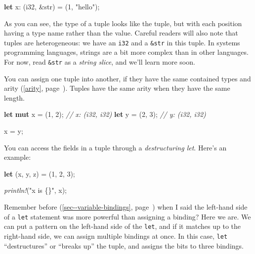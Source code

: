 \documentclass[a4paper,]{book}
\renewcommand*{\hyperlink}[2]{%
 #2 (\autoref{#1}, page~\pageref{#1})}
\newenvironment{Shaded}{\begin{snugshade}}{\end{snugshade}}
\newcommand{\KeywordTok}[1]{\textcolor[rgb]{0.13,0.29,0.53}{\textbf{{#1}}}}
\newcommand{\DataTypeTok}[1]{\textcolor[rgb]{0.13,0.29,0.53}{{#1}}}
\newcommand{\DecValTok}[1]{\textcolor[rgb]{0.00,0.00,0.81}{{#1}}}
\newcommand{\StringTok}[1]{\textcolor[rgb]{0.31,0.60,0.02}{{#1}}}
\newcommand{\CommentTok}[1]{\textcolor[rgb]{0.56,0.35,0.01}{\textit{{#1}}}}
\newcommand{\PreprocessorTok}[1]{\textcolor[rgb]{0.56,0.35,0.01}{\textit{{#1}}}}
\newcommand{\NormalTok}[1]{{#1}}
\begin{document}
\begin{Shaded}
\begin{Highlighting}[]
\KeywordTok{let} \NormalTok{x: (}\DataTypeTok{i32}\NormalTok{, &}\DataTypeTok{str}\NormalTok{) = (}\DecValTok{1}\NormalTok{, }\StringTok{"hello"}\NormalTok{);}
\end{Highlighting}
\end{Shaded}

As you can see, the type of a tuple looks like the tuple, but with each
position having a type name rather than the value. Careful readers will
also note that tuples are heterogeneous: we have an \texttt{i32} and a
\texttt{\&str} in this tuple. In systems programming languages, strings
are a bit more complex than in other languages. For now, read
\texttt{\&str} as a \emph{string slice}, and we'll learn more soon.

You can assign one tuple into another, if they have the same contained
types and \protect\hyperlink{arity}{arity}. Tuples have the same arity
when they have the same length.

\begin{Shaded}
\begin{Highlighting}[]
\KeywordTok{let} \KeywordTok{mut} \NormalTok{x = (}\DecValTok{1}\NormalTok{, }\DecValTok{2}\NormalTok{); }\CommentTok{// x: (i32, i32)}
\KeywordTok{let} \NormalTok{y = (}\DecValTok{2}\NormalTok{, }\DecValTok{3}\NormalTok{); }\CommentTok{// y: (i32, i32)}

\NormalTok{x = y;}
\end{Highlighting}
\end{Shaded}

You can access the fields in a tuple through a \emph{destructuring let}.
Here's an example:

\begin{Shaded}
\begin{Highlighting}[]
\KeywordTok{let} \NormalTok{(x, y, z) = (}\DecValTok{1}\NormalTok{, }\DecValTok{2}\NormalTok{, }\DecValTok{3}\NormalTok{);}

\PreprocessorTok{println!}\NormalTok{(}\StringTok{"x is \{\}"}\NormalTok{, x);}
\end{Highlighting}
\end{Shaded}

Remember \protect\hyperlink{sec--variable-bindings}{before} when I said
the left-hand side of a \texttt{let} statement was more powerful than
assigning a binding? Here we are. We can put a pattern on the left-hand
side of the \texttt{let}, and if it matches up to the right-hand side,
we can assign multiple bindings at once. In this case, \texttt{let}
``destructures'' or ``breaks up'' the tuple, and assigns the bits to
three bindings.
\end{document}
